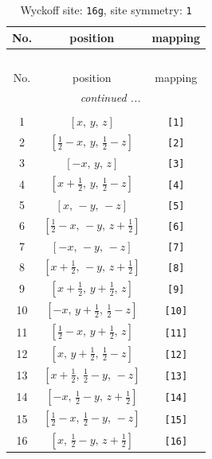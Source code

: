 \documentclass[fleqn,8pt]{jsarticle}
\begin{document}
\begin{longtable}{ccc}
\caption{Wyckoff site: {\tt 16g}, site symmetry: {\tt 1}}
 \\
 \hline \hline
No. & position & mapping \\ \hline \endfirsthead

\multicolumn{2}{l}{\tablename\ \thetable{}} \\
 \hline \hline
No. & position & mapping \\ \hline \endhead

 \hline \hline
\multicolumn{2}{r}{\footnotesize\it continued ...} \\ \endfoot

 \hline \hline
\multicolumn{2}{r}{} \\ \endlastfoot

1 & $\left[ x,\, y,\, z \right]$ & {\tt [1]} \\ \hline
2 & $\left[ \frac{1}{2} - x,\, y,\, \frac{1}{2} - z \right]$ & {\tt [2]} \\ \hline
3 & $\left[ - x,\, y,\, z \right]$ & {\tt [3]} \\ \hline
4 & $\left[ x + \frac{1}{2},\, y,\, \frac{1}{2} - z \right]$ & {\tt [4]} \\ \hline
5 & $\left[ x,\, - y,\, - z \right]$ & {\tt [5]} \\ \hline
6 & $\left[ \frac{1}{2} - x,\, - y,\, z + \frac{1}{2} \right]$ & {\tt [6]} \\ \hline
7 & $\left[ - x,\, - y,\, - z \right]$ & {\tt [7]} \\ \hline
8 & $\left[ x + \frac{1}{2},\, - y,\, z + \frac{1}{2} \right]$ & {\tt [8]} \\ \hline
9 & $\left[ x + \frac{1}{2},\, y + \frac{1}{2},\, z \right]$ & {\tt [9]} \\ \hline
10 & $\left[ - x,\, y + \frac{1}{2},\, \frac{1}{2} - z \right]$ & {\tt [10]} \\ \hline
11 & $\left[ \frac{1}{2} - x,\, y + \frac{1}{2},\, z \right]$ & {\tt [11]} \\ \hline
12 & $\left[ x,\, y + \frac{1}{2},\, \frac{1}{2} - z \right]$ & {\tt [12]} \\ \hline
13 & $\left[ x + \frac{1}{2},\, \frac{1}{2} - y,\, - z \right]$ & {\tt [13]} \\ \hline
14 & $\left[ - x,\, \frac{1}{2} - y,\, z + \frac{1}{2} \right]$ & {\tt [14]} \\ \hline
15 & $\left[ \frac{1}{2} - x,\, \frac{1}{2} - y,\, - z \right]$ & {\tt [15]} \\ \hline
16 & $\left[ x,\, \frac{1}{2} - y,\, z + \frac{1}{2} \right]$ & {\tt [16]} \\
\end{longtable}
\end{document}
